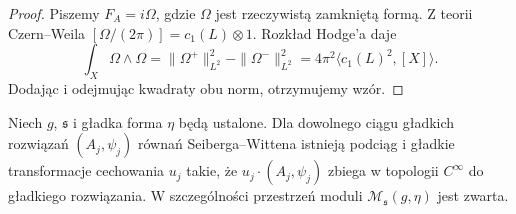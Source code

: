 \begin{proof}
Piszemy $F_A=i\Omega$, gdzie $\Omega$ jest rzeczywistą
zamkniętą formą. Z teorii Czern--Weila
$[\Omega/(2\pi)]=c_1(L)\otimes1$.
Rozkład Hodge'a daje
\[
\int_X\Omega\wedge\Omega
=\|\Omega^+\|_{L^2}^2-\|\Omega^-\|_{L^2}^2
=4\pi^2\langle c_1(L)^2,[X]\rangle.
\]
Dodając i odejmując kwadraty obu norm, otrzymujemy wzór.
\end{proof}

\begin{twierdzenie}
\label{thm:tg-sw12-compact}
Niech $g$, $\mathfrak s$ i gładka forma $\eta$ będą ustalone.
Dla dowolnego ciągu gładkich rozwiązań
$(A_j,\psi_j)$ równań Seiberga--Wittena istnieją podciąg
i gładkie transformacje cechowania $u_j$ takie, że
$u_j\cdot(A_j,\psi_j)$ zbiega w topologii $C^\infty$
do gładkiego rozwiązania. W szczególności przestrzeń
moduli $\mathcal M_{\mathfrak s}(g,\eta)$ jest zwarta.
\end{twierdzenie}

